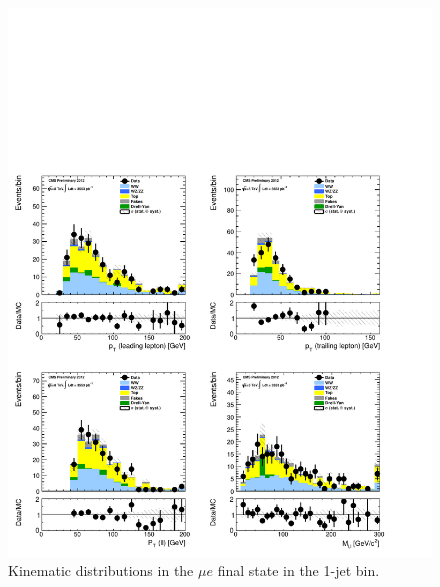 \begin{figure}[!hbtp]
\centering
\includegraphics[width=1\textwidth]{figures/ww_analysis20_0_ALL_me_1j.pdf}
\caption{Kinematic distributions in the $\mu e$ final state in the 1-jet bin.}
\label{fig:xs_kinematics_me_1j}
\end{figure}
